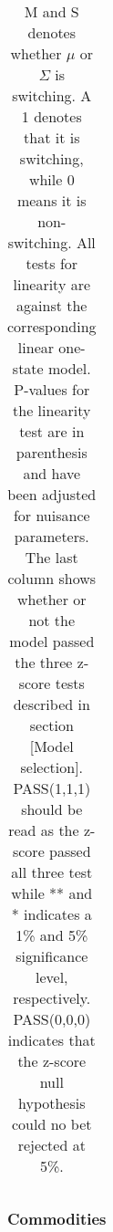 \documentclass[11pt,a4paper,oneside]{article}
\begin{document}
\begin{table}[h!]
\begin{tabular}{lrrrrrrrr}
\bottomrule
\end{tabular}
\caption*{M and S denotes whether $\mu$ or $\Sigma$ is switching. A 1 denotes that it is switching, while 0 means it is non-switching. All tests for linearity are against the corresponding linear one-state model. P-values for the linearity test are in parenthesis and have been adjusted for nuisance parameters. The last column shows whether or not the model passed the three z-score tests described in section [Model selection]. PASS(1,1,1) should be read as the z-score passed all three test while ** and * indicates a 1\% and 5\% significance level, respectively. PASS(0,0,0) indicates that the z-score null hypothesis could no bet rejected at 5\%.}
\vspace{-20mm}
\end{table}

\newpage
{}
\recalctypearea



\subsubsection*{Commodities}


\newpage
{}
\recalctypearea
\end{document}
